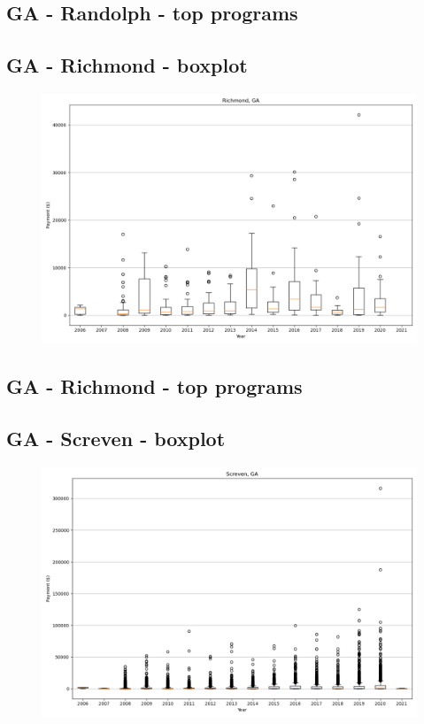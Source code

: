 \subsection*{GA - Randolph - top programs}

\newpage
\subsection*{GA - Richmond - boxplot}
\begin{figure}[h]
\centering
\includegraphics[width=7in]{../output/boxplots/counties/Richmond-GA_boxplot.png}
\end{figure}


\subsection*{GA - Richmond - top programs}

\newpage
\subsection*{GA - Screven - boxplot}
\begin{figure}[h]
\centering
\includegraphics[width=7in]{../output/boxplots/counties/Screven-GA_boxplot.png}
\end{figure}


